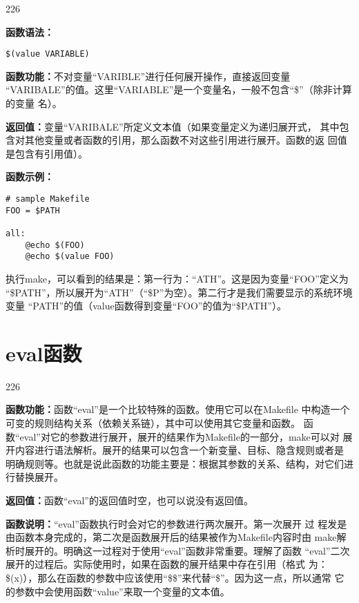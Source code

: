 \begin{dinglist}{226}
\itemsep=4pt \parskip=0pt

\item \textbf{函数语法：}

\begin{Verbatim}[]
$(value VARIABLE)
\end{Verbatim}

\item \textbf{函数功能：}不对变量“VARIBLE”进行任何展开操作，直接返回变量
    “VARIBALE”的值。这里“VARIABLE”是一个变量名，一般不包含“\$”（除非计算的变量
    名）。


\item \textbf{返回值：}变量“VARIBALE”所定义文本值（如果变量定义为递归展开式，
    其中包含对其他变量或者函数的引用，那么函数不对这些引用进行展开。函数的返
    回值是包含有引用值）。

\item \textbf{函数示例：}
\begin{Verbatim}[]
# sample Makefile
FOO = $PATH

all:
    @echo $(FOO)
    @echo $(value FOO)
\end{Verbatim}

执行make，可以看到的结果是：第一行为：“ATH”。这是因为变量“FOO”定义为
“\$PATH”，所以展开为“ATH”（“\$P”为空）。第二行才是我们需要显示的系统环境变量
“PATH”的值（value函数得到变量“FOO”的值为“\$PATH”）。

\end{dinglist}

\section{eval函数}

\begin{dinglist}{226}
\itemsep=4pt \parskip=0pt

\item \textbf{函数功能：}函数“eval”是一个比较特殊的函数。使用它可以在Makefile
    中构造一个可变的规则结构关系（依赖关系链），其中可以使用其它变量和函数。
    函数“eval”对它的参数进行展开，展开的结果作为Makefile的一部分，make可以对
    展开内容进行语法解析。展开的结果可以包含一个新变量、目标、隐含规则或者是
    明确规则等。也就是说此函数的功能主要是：根据其参数的关系、结构，对它们进
    行替换展开。


\item \textbf{返回值：}函数“eval”的返回值时空，也可以说没有返回值。


\item \textbf{函数说明：}“eval”函数执行时会对它的参数进行两次展开。第一次展开
    过
    程发是由函数本身完成的，第二次是函数展开后的结果被作为Makefile内容时由
    make解析时展开的。明确这一过程对于使用“eval”函数非常重要。理解了函数
    “eval”二次展开的过程后。实际使用时，如果在函数的展开结果中存在引用（格式
    为：\$(x)），那么在函数的参数中应该使用“\$\$”来代替“\$”。因为这一点，所以通常
    它的参数中会使用函数“value”来取一个变量的文本值。



\end{dinglist}

